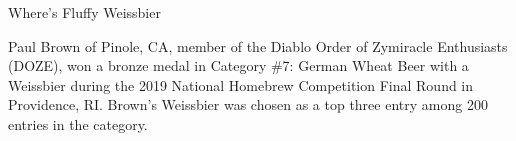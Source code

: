\begin{recipe}{Where's Fluffy Weissbier}

\begin{aboutblock}
Paul Brown of Pinole, CA, member of the Diablo Order of Zymiracle Enthusiasts (DOZE),
won a bronze medal in Category \#7: German Wheat Beer with a Weissbier during the 2019
National Homebrew Competition Final Round in Providence, RI. Brown's Weissbier was
chosen as a top three entry among 200 entries in the category. \sourceaha
\end{aboutblock}


\begin{methodandtiming}
 
\begin{mashsteps}
\end{mashsteps}

\begin{fermentationsteps}
\end{fermentationsteps}

\end{methodandtiming}

\recipebreak

\begin{ingredientsblock}

\begin{malts}
\end{malts}

\begin{hops}
\end{hops}


\end{ingredientsblock}

\end{recipe}
